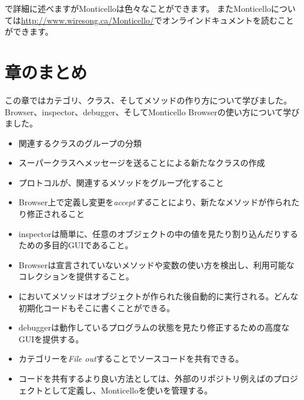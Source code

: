 \documentclass[a4paper,10pt,twoside]{book}
\begin{document}
で詳細に述べますがMonticelloは色々なことができます。
またMonticelloについては\url{http://www.wiresong.ca/Monticello/}でオンラインドキュメントを読むことができます。

\section{章のまとめ}
この章ではカテゴリ、クラス、そしてメソッドの作り方について学びました。
Browser、inspector、debugger、そしてMonticello Browserの使い方について学びました。

\begin{itemize}
  \item 関連するクラスのグループの分類
  \item スーパークラスへメッセージを送ることによる新たなクラスの作成
  \item プロトコルが、関連するメソッドをグループ化すること
  \item Browser上で定義し変更を\emph{acceptする}ことにより、新たなメソッドが作られたり修正されること
  \item inspectorは簡単に、任意のオブジェクトの中の値を見たり割り込んだりするための多目的GUIであること。
  \item Browserは宣言されていないメソッドや変数の使い方を検出し、利用可能なコレクションを提供すること。
  \item \pharo においてメソッドはオブジェクトが作られた後自動的に実行される。どんな初期化コードもそこに書くことができる。
  \item debuggerは動作しているプログラムの状態を見たり修正するための高度なGUIを提供する。
  \item カテゴリーを\emph{File out}することでソースコードを共有できる。
  \item コードを共有するより良い方法としては、外部のリポジトリ例えば\sqsrc のプロジェクトとして定義し、Monticelloを使いを管理する。
\end{itemize}

\ifx\wholebook\relax\else
\end{document}
